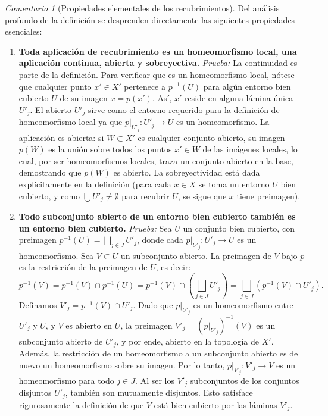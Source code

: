 \documentclass[11pt,a4paper]{article}
\theoremstyle{definition}
\theoremstyle{remark}
\newtheorem{observacion}{Comentario}[section]
\numberwithin{equation}{section}
\begin{document}
\begin{observacion}[Propiedades elementales de los recubrimientos]
Del análisis profundo de la definición se desprenden directamente las siguientes propiedades esenciales:
\begin{enumerate}
    \item \textbf{Toda aplicación de recubrimiento es un homeomorfismo local, una aplicación continua, abierta y sobreyectiva.} 
    \textit{Prueba:} La continuidad es parte de la definición. Para verificar que es un homeomorfismo local, nótese que cualquier punto $x' \in X'$ pertenece a $p^{-1}(U)$ para algún entorno bien cubierto $U$ de su imagen $x = p(x')$. Así, $x'$ reside en alguna lámina única $U'_j$. El abierto $U'_j$ sirve como el entorno requerido para la definición de homeomorfismo local ya que $p|_{U'_j}: U'_j \to U$ es un homeomorfismo.
    La aplicación es abierta: si $W \subset X'$ es cualquier conjunto abierto, su imagen $p(W)$ es la unión sobre todos los puntos $x' \in W$ de las imágenes locales, lo cual, por ser homeomorfismos locales, traza un conjunto abierto en la base, demostrando que $p(W)$ es abierto.
    La sobreyectividad está dada explícitamente en la definición (para cada $x \in X$ se toma un entorno $U$ bien cubierto, y como $\bigcup U'_j \neq \emptyset$ para recubrir $U$, se sigue que $x$ tiene preimagen).
    \item \textbf{Todo subconjunto abierto de un entorno bien cubierto también es un entorno bien cubierto.}
    \textit{Prueba:} Sea $U$ un conjunto bien cubierto, con preimagen $p^{-1}(U) = \bigsqcup_{j \in J} U'_j$, donde cada $p|_{U'_j}: U'_j \to U$ es un homeomorfismo. Sea $V \subset U$ un subconjunto abierto. La preimagen de $V$ bajo $p$ es la restricción de la preimagen de $U$, es decir:
    \begin{equation*}
    p^{-1}(V) = p^{-1}(V) \cap p^{-1}(U) = p^{-1}(V) \cap \left( \bigsqcup_{j \in J} U'_j \right) = \bigsqcup_{j \in J} \left( p^{-1}(V) \cap U'_j \right).
    \end{equation*}
    Definamos $V'_j = p^{-1}(V) \cap U'_j$. Dado que $p|_{U'_j}$ es un homeomorfismo entre $U'_j$ y $U$, y $V$ es abierto en $U$, la preimagen $V'_j = (p|_{U'_j})^{-1}(V)$ es un subconjunto abierto de $U'_j$, y por ende, abierto en la topología de $X'$. Además, la restricción de un homeomorfismo a un subconjunto abierto es de nuevo un homeomorfismo sobre su imagen. Por lo tanto, $p|_{V'_j} : V'_j \to V$ es un homeomorfismo para todo $j \in J$. Al ser los $V'_j$ subconjuntos de los conjuntos disjuntos $U'_j$, también son mutuamente disjuntos. Esto satisface rigurosamente la definición de que $V$ está bien cubierto por las láminas $V'_j$.
\end{enumerate}
\end{observacion}
\end{document}
